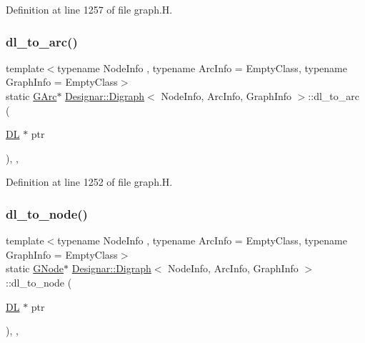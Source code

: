 Definition at line 1257 of file graph.\+H.

\mbox{\label{class_designar_1_1_digraph_af9581e9d0825da11ce153bd055149f7f}} 
\subsubsection{\texorpdfstring{dl\+\_\+to\+\_\+arc()}{dl\_to\_arc()}}
{\footnotesize\ttfamily template$<$typename Node\+Info , typename Arc\+Info  = Empty\+Class, typename Graph\+Info  = Empty\+Class$>$ \\
static \hyperlink{class_designar_1_1_digraph_a341acf8fb0195a8986158c29c4db1a89}{G\+Arc}$\ast$ \hyperlink{class_designar_1_1_digraph}{Designar\+::\+Digraph}$<$ Node\+Info, Arc\+Info, Graph\+Info $>$\+::dl\+\_\+to\+\_\+arc (\begin{DoxyParamCaption}\item[{\hyperlink{class_designar_1_1_d_l}{DL} $\ast$}]{ptr }\end{DoxyParamCaption})\hspace{0.3cm}{\ttfamily [inline]}, {\ttfamily [static]}, {\ttfamily [protected]}}



Definition at line 1252 of file graph.\+H.

\mbox{\label{class_designar_1_1_digraph_adbb91274c17d6087fdd5721e3f9b1f7c}} 
\subsubsection{\texorpdfstring{dl\+\_\+to\+\_\+node()}{dl\_to\_node()}}
{\footnotesize\ttfamily template$<$typename Node\+Info , typename Arc\+Info  = Empty\+Class, typename Graph\+Info  = Empty\+Class$>$ \\
static \hyperlink{class_designar_1_1_digraph_a33b0d2b8820ada501522b0e67e63524a}{G\+Node}$\ast$ \hyperlink{class_designar_1_1_digraph}{Designar\+::\+Digraph}$<$ Node\+Info, Arc\+Info, Graph\+Info $>$\+::dl\+\_\+to\+\_\+node (\begin{DoxyParamCaption}\item[{\hyperlink{class_designar_1_1_d_l}{DL} $\ast$}]{ptr }\end{DoxyParamCaption})\hspace{0.3cm}{\ttfamily [inline]}, {\ttfamily [static]}, {\ttfamily [protected]}}



